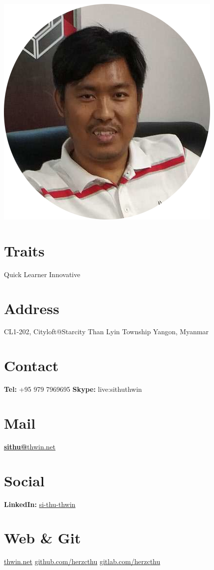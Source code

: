 \documentclass[]{friggeri-cv}
\begin{document}
\begin{aside}
  \includegraphics[scale=1]{img/myself-circle.png}
  \section{Traits}
    Quick Learner
    Innovative
  \section{Address}
    CL1-202, Cityloft@Starcity
    Than Lyin Township
    Yangon, Myanmar
    ~
  \section{Contact}
    \textbf{Tel:} +95 979 7969695
    \textbf{Skype:} live:sithuthwin
    ~
  \section{Mail}
    \href{mailto:sithu@thwin.net}{\textbf{sithu@}thwin.net}
    ~
  \section{Social}
    \textbf{LinkedIn:} \href{https://www.linkedin.com/in/si-thu-thwin/}{si-thu-thwin}
    ~
  \section{Web \& Git}
    \href{https://www.thwin.net}{thwin.net}
    \href{https://github.com/herzcthu}{github.com/herzcthu}
    \href{https://gitlab.com/herzcthu}{gitlab.com/herzcthu}
    ~

\end{aside}
\end{document}

